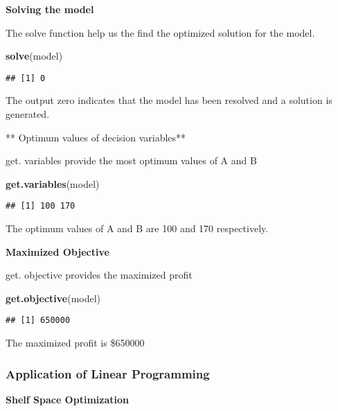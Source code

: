 \documentclass[]{article}
\newenvironment{Shaded}{\begin{snugshade}}{\end{snugshade}}
\newcommand{\KeywordTok}[1]{\textcolor[rgb]{0.13,0.29,0.53}{\textbf{{#1}}}}
\newcommand{\NormalTok}[1]{{#1}}
\begin{document}
\textbf{Solving the model}

The solve function help us the find the optimized solution for the
model.

\begin{Shaded}
\begin{Highlighting}[]
\KeywordTok{solve}\NormalTok{(model)}
\end{Highlighting}
\end{Shaded}

\begin{verbatim}
## [1] 0
\end{verbatim}

The output zero indicates that the model has been resolved and a
solution is generated.

** Optimum values of decision variables**

get. variables provide the most optimum values of A and B

\begin{Shaded}
\begin{Highlighting}[]
\KeywordTok{get.variables}\NormalTok{(model)}
\end{Highlighting}
\end{Shaded}

\begin{verbatim}
## [1] 100 170
\end{verbatim}

The optimum values of A and B are 100 and 170 respectively.

\textbf{Maximized Objective}

get. objective provides the maximized profit

\begin{Shaded}
\begin{Highlighting}[]
\KeywordTok{get.objective}\NormalTok{(model)}
\end{Highlighting}
\end{Shaded}

\begin{verbatim}
## [1] 650000
\end{verbatim}

The maximized profit is \$650000

\subsubsection{Application of Linear
Programming}\label{application-of-linear-programming}

\textbf{Shelf Space Optimization}
\end{document}
